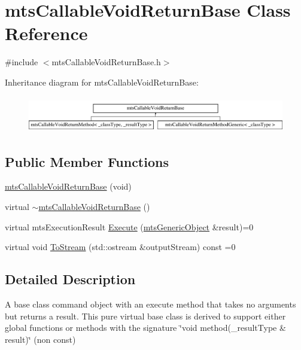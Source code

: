 \hypertarget{classmts_callable_void_return_base}{}\section{mts\+Callable\+Void\+Return\+Base Class Reference}
\label{classmts_callable_void_return_base}


{\ttfamily \#include $<$mts\+Callable\+Void\+Return\+Base.\+h$>$}

Inheritance diagram for mts\+Callable\+Void\+Return\+Base\+:\begin{figure}[H]
\begin{center}
\leavevmode
\includegraphics[height=1.590909cm]{d9/ddd/classmts_callable_void_return_base}
\end{center}
\end{figure}
\subsection*{Public Member Functions}
\begin{DoxyCompactItemize}
\item 
\hyperlink{classmts_callable_void_return_base_ac353432b81aacb59a0fa3707fa15fcfc}{mts\+Callable\+Void\+Return\+Base} (void)
\item 
virtual \hyperlink{classmts_callable_void_return_base_a528fa7ce7713010f7c054d5a346bd802}{$\sim$mts\+Callable\+Void\+Return\+Base} ()
\item 
virtual mts\+Execution\+Result \hyperlink{classmts_callable_void_return_base_a7f0fe84a7078bad40663aa86cd455fc2}{Execute} (\hyperlink{classmts_generic_object}{mts\+Generic\+Object} \&result)=0
\item 
virtual void \hyperlink{classmts_callable_void_return_base_ab5c0d1c688e1996c31260e95525f8f6d}{To\+Stream} (std\+::ostream \&output\+Stream) const =0
\end{DoxyCompactItemize}


\subsection{Detailed Description}
A base class command object with an execute method that takes no arguments but returns a result. This pure virtual base class is derived to support either global functions or methods with the signature \char`\"{}void method(\+\_\+result\+Type \& result)\char`\"{} (non const) 

